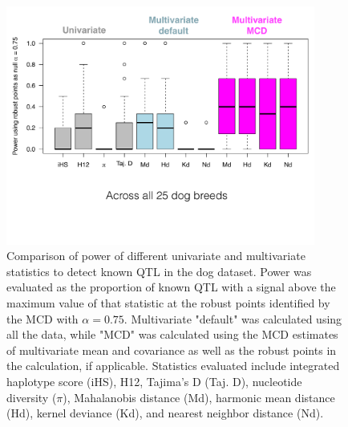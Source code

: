 \documentclass[12pt, oneside]{amsart}
\begin{document}
\newpage
\begin{figure}[h]
\begin{center}
\includegraphics[width=4in]{../figures_man2/F4-DogPower_alpha075_title.pdf}
\end{center}
\caption[]{Comparison of power of different univariate and multivariate statistics to detect known QTL in the dog dataset. Power was evaluated as the proportion of known QTL with a signal above the maximum value of that statistic at the robust points identified by the MCD with $\alpha=0.75$. Multivariate "default" was calculated using all the data, while "MCD" was calculated using the MCD estimates of multivariate mean and covariance as well as the robust points in the calculation, if applicable.  Statistics evaluated include integrated haplotype score (iHS), H12, Tajima's D (Taj. D), nucleotide diversity ($\pi$), Mahalanobis distance (Md), harmonic mean distance (Hd), kernel deviance (Kd), and nearest neighbor distance (Nd). } 
 \label{fig:???}
\end{figure}
\end{document}
